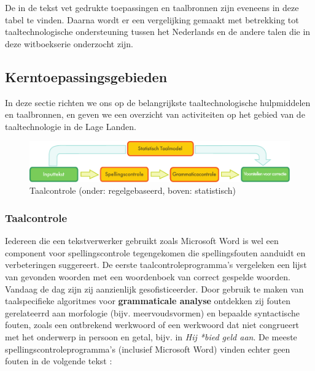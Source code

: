 \begin{multicols}{2}
De in de tekst vet gedrukte toepassingen en taalbronnen zijn eveneens in deze tabel te vinden. Daarna wordt er een vergelijking gemaakt met betrekking tot  taaltechnologische ondersteuning tussen het Nederlands en de andere talen die in deze witboekserie onderzocht zijn.


\subsection{Kerntoepassingsgebieden}


In deze sectie richten we ons op de belangrijkste taaltechnologische hulpmiddelen en taalbronnen, en geven we een overzicht van  activiteiten op het gebied van de taaltechnologie in de Lage Landen.

\begin{figure}[t]
  \center
  \includegraphics[width=\textwidth]{../_media/dutch/language_checking}
  \caption{Taalcontrole (onder: regelgebaseerd, boven: statistisch)}
  \label{fig:langcheckingaarch_de}
\end{figure}


\subsubsection{Taalcontrole}

    Iedereen die een tekstverwerker gebruikt zoals Microsoft Word is wel een component voor spellingscontrole tegengekomen die spellingsfouten aanduidt en verbeteringen suggereert.  De eerste taalcontroleprogramma's vergeleken een lijst van gevonden woorden met een woordenboek van correct gespelde woorden. Vandaag de dag zijn zij aanzienlijk gesofisticeerder. Door gebruik te maken van taalspecifieke algoritmes voor \textbf{grammaticale analyse} ontdekken zij fouten gerelateerrd aan morfologie (bijv. meervoudsvormen) en bepaalde syntactische fouten, zoals een ontbrekend werkwoord of een werkwoord dat niet congrueert met het onderwerp in persoon en getal, bijv. in \emph{Hij *bied geld aan}. De meeste spellingscontroleprogramma's (inclusief Microsoft Word) vinden echter geen fouten in de volgende tekst \cite{zar1}:



\end{multicols}
